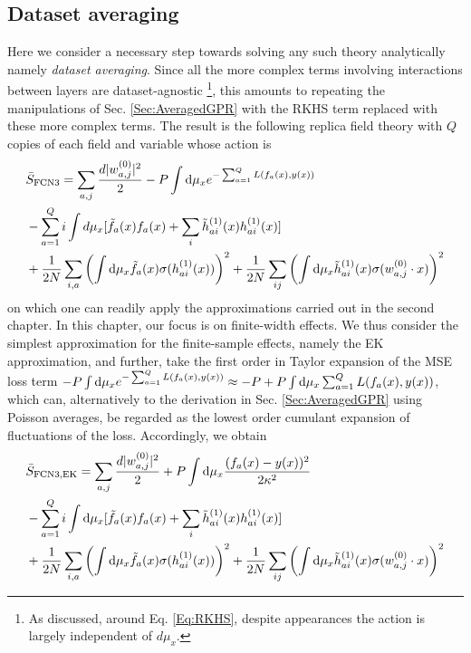 \subsection{Dataset averaging}
Here we consider a necessary step towards solving any such theory analytically namely {\it dataset averaging}. Since all the more complex terms involving interactions between layers are dataset-agnostic \footnote{As discussed, around Eq. \ref{Eq:RKHS}, despite appearances the action is largely independent of $d\mu_x$.}, this amounts to repeating the manipulations of Sec. \ref{Sec:AveragedGPR} with the RKHS term replaced with these more complex terms. The result is the following replica field theory with $Q$ copies of each field and variable whose action is  
\begin{align}
\label{Eq:BarSFCN3}
&\bar{S}_{\text{FCN3}}= \sum_{a,j}\frac{d |{ w_{a,j}^{(0)}}|^2}{2} - P\int \text{d} \mu_x e^{-\sum_{a=1}^Q L(f_a(x),y(x))} \\ \nonumber &- \sum_{a=1}^Q i\int d\mu_x [\tilde{f}_a(x) f_a(x)+\sum_i
\tilde{h}^{(1)}_{ai}(x) h^{(1)}_{ai}(x)] \\ \nonumber 
&+\frac{1}{2N} \sum_{i,a} \left(\int \text{d}\mu_x \tilde{f}_a(x) \sigma(h^{(1)}_{ai}(x))\right)^2 + \frac{1}{2N}\sum_{ij}\left( \int \text{d} \mu_x \tilde{h}^{(1)}_{ai}(x) \sigma({w}^{(0)}_{a,j} \cdot {x})\right)^2
\end{align}
on which one can readily apply the approximations carried out in the second chapter. In this chapter, our focus is on finite-width effects. We thus consider the simplest approximation for the finite-sample effects, namely the EK approximation, and further, take the first order in Taylor expansion of the MSE loss term $- P\int \text{d} \mu_x e^{-\sum_{a=1}^Q L(f_a(x),y(x))} \approx - P + P\int \text{d} \mu_x \sum_{a=1}^Q L(f_a(x),y(x))$, which can, alternatively to the derivation in Sec. \ref{Sec:AveragedGPR} using Poisson averages, be regarded as the lowest order cumulant expansion of fluctuations of the loss. Accordingly, we obtain
\begin{align}
&\bar{S}_{\text{FCN3,EK}}= \sum_{a,j}\frac{d |{ w_{a,j}^{(0)}}|^2}{2}+P\int \text{d}\mu_x \frac{(f_a(x) - y(x))^2}{2\kappa^2}\\ \nonumber &- \sum_{a=1}^Q i\int \text{d} \mu_x [\tilde{f}_a(x) f_a(x)+\sum_i
\tilde{h}^{(1)}_{ai}(x) h^{(1)}_{ai}(x)] \\ \nonumber 
&+\frac{1}{2N} \sum_{i,a} \left(\int \text{d} \mu_x \tilde{f}_a(x) \sigma(h^{(1)}_{ai}(x))\right)^2 + \frac{1}{2N}\sum_{ij}\left( \int \text{d} \mu_x \tilde{h}^{(1)}_{ai}(x) \sigma({w}^{(0)}_{a,j} \cdot {x})\right)^2
\end{align}
